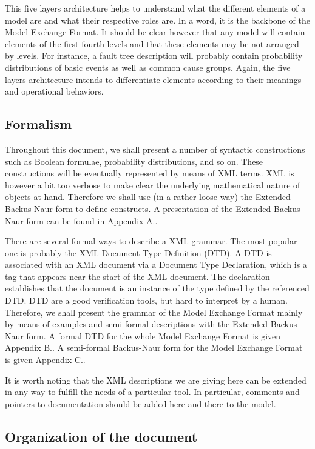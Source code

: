 \documentclass[11pt]{article}
\begin{document}
This five layers architecture helps to understand what the different
elements of a model are and what their respective roles are. In a word,
it is the backbone of the Model Exchange Format. It should be clear
however that any model will contain elements of the first fourth levels
and that these elements may be not arranged by levels. For instance, a
fault tree description will probably contain probability distributions
of basic events as well as common cause groups. Again, the five layers
architecture intends to differentiate elements according to their
meanings and operational behaviors.

\subsection{Formalism}
\label{sec:org6a3b3b4}

Throughout this document, we shall present a number of syntactic
constructions such as Boolean formulae, probability distributions, and
so on. These constructions will be eventually represented by means of
XML terms. XML is however a bit too verbose to make clear the underlying
mathematical nature of objects at hand. Therefore we shall use (in a
rather loose way) the Extended Backus-Naur form to define constructs. A
presentation of the Extended Backus-Naur form can be found in Appendix A..

There are several formal ways to describe a XML grammar. The most
popular one is probably the XML Document Type Definition (DTD). A DTD is
associated with an XML document via a Document Type Declaration, which
is a tag that appears near the start of the XML document. The
declaration establishes that the document is an instance of the type
defined by the referenced DTD. DTD are a good verification tools, but
hard to interpret by a human. Therefore, we shall present the grammar of
the Model Exchange Format mainly by means of examples and semi-formal
descriptions with the Extended Backus Naur form. A formal DTD for the
whole Model Exchange Format is given Appendix B.. A semi-formal
Backus-Naur form for the Model Exchange Format is given Appendix C..

It is worth noting that the XML descriptions we are giving here can be
extended in any way to fulfill the needs of a particular tool. In
particular, comments and pointers to documentation should be added here
and there to the model.

\subsection{Organization of the document}
\label{sec:org9729f86}
\end{document}
